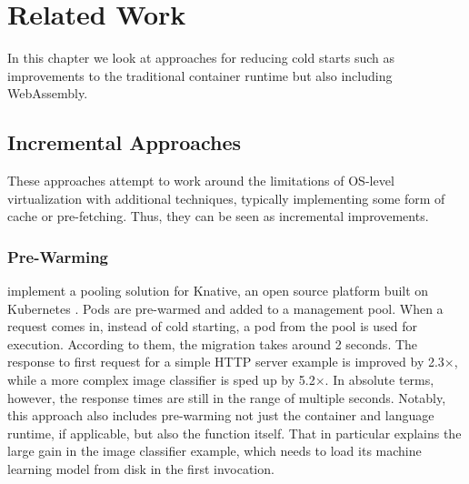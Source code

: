 \chapter{Related Work}
\label{chapter:relatedwork}

In this chapter we look at approaches for reducing cold starts such as improvements to the traditional container runtime but also including WebAssembly.

\section{Incremental Approaches}

These approaches attempt to work around the limitations of OS-level virtualization with additional techniques, typically implementing some form of cache or pre-fetching. Thus, they can be seen as incremental improvements.

\subsection{Pre-Warming}

\citeauthor{Lin2019} implement a pooling solution for Knative, an open source platform built on Kubernetes \cite{Lin2019}. Pods are pre-warmed and added to a management pool. When a request comes in, instead of cold starting, a pod from the pool is used for execution. According to them, the migration takes around 2 seconds. The response to first request for a simple HTTP server example is improved by 2.3$\times$, while a more complex image classifier is sped up by 5.2$\times$. In absolute terms, however, the response times are still in the range of multiple seconds. Notably, this approach also includes pre-warming not just the container and language runtime, if applicable, but also the function itself. That in particular explains the large gain in the image classifier example, which needs to load its machine learning model from disk in the first invocation.

